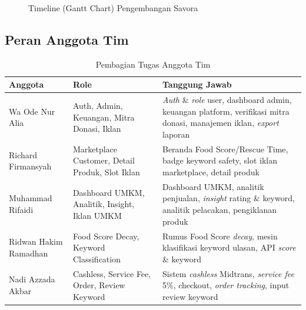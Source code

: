 \begin{figure}[htbp]
\centering
{}
\caption{Timeline (Gantt Chart) Pengembangan Savora}
\label{fig:gantt}
\end{figure}

\subsection{Peran Anggota Tim}

\begin{table}[htbp]
\centering
\caption{Pembagian Tugas Anggota Tim}
\label{tab:peran}
\begin{tabularx}{\textwidth}{|l|Y|Y|}
\hline
\textbf{Anggota} & \textbf{Role} & \textbf{Tanggung Jawab} \\
\hline
Wa Ode Nur Alia & Auth, Admin, Keuangan, Mitra Donasi, Iklan & \textit{Auth} \& \textit{role} user, dashboard admin, keuangan platform, verifikasi mitra donasi, manajemen iklan, \textit{export} laporan \\
\hline
Richard Firmansyah & Marketplace Customer, Detail Produk, Slot Iklan & Beranda Food Score/Rescue Time, badge keyword safety, slot iklan marketplace, detail produk \\
\hline
Muhammad Rifaidi & Dashboard UMKM, Analitik, Insight, Iklan UMKM & Dashboard UMKM, analitik penjualan, \textit{insight} rating \& keyword, analitik pelacakan, pengiklanan produk \\
\hline
Ridwan Hakim Ramadhan & Food Score Decay, Keyword Classification & Rumus Food Score \textit{decay}, mesin klasifikasi keyword ulasan, API \textit{score} \& keyword \\
\hline
Nadi Azzada Akbar & Cashless, Service Fee, Order, Review Keyword & Sistem \textit{cashless} Midtrans, \textit{service fee} 5\%, checkout, \textit{order tracking}, input review keyword \\
\hline
\end{tabularx}
\end{table}


